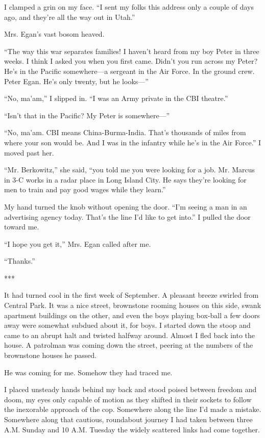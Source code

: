 \documentclass{novel}
\begin{document}
{I clamped a grin on my face. “I sent my folks this address only a couple of days ago, and they’re all the way out in Utah.”

Mrs. Egan’s vast bosom heaved.

“The way this war separates families! I haven’t heard from my boy Peter in three weeks. I think I asked you when you first came. Didn’t you run across my Peter? He’s in the Pacific somewhere—a sergeant in the Air Force. In the ground crew. Peter Egan. He’s only twenty, but he looks—”

“No, ma’am,” I slipped in. “I was an Army private in the CBI theatre.”

“Isn’t that in the Pacific? My Peter is somewhere—”

“No, ma’am. CBI means China-Burma-India. That’s thousands of miles from where your son would be. And I was in the infantry while he’s in the Air Force.” I moved past her.

“Mr. Berkowitz,” she said, “you told me you were looking for a job. Mr. Marcus in 3-C works in a radar place in Long Island City. He says they’re looking for men to train and pay good wages while they learn.”

My hand turned the knob without opening the door. “I’m seeing a man in an advertising agency today. That’s the line I’d like to get into.” I pulled the door toward me.

“I hope you get it,” Mrs. Egan called after me.

“Thanks.”

***

It had turned cool in the first week of September. A pleasant breeze swirled from Central Park. It was a nice street, brownstone rooming houses on this side, swank apartment buildings on the other, and even the boys playing box-ball a few doors away were somewhat subdued about it, for boys. I started down the stoop and came to an abrupt halt and twisted halfway around. Almost I fled back into the house. A patrolman was coming down the street, peering at the numbers of the brownstone houses he passed.

He was coming for me. Somehow they had traced me.

I placed unsteady hands behind my back and stood poised between freedom and doom, my eyes only capable of motion as they shifted in their sockets to follow the inexorable approach of the cop. Somewhere along the line I’d made a mistake. Somewhere along that cautious, roundabout journey I had taken between three A.M. Sunday and 10 A.M. Tuesday the widely scattered links had come together.

}
\end{document}
